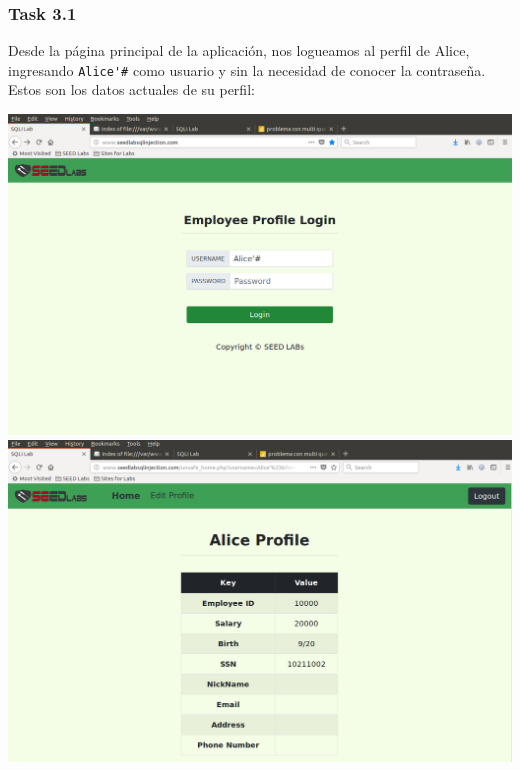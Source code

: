 \documentclass[11pt]{article}
\begin{document}
\subsubsection*{Task 3.1}
Desde la página principal de la aplicación, nos logueamos al perfil de Alice, ingresando \verb|Alice'#| como usuario 
y sin la necesidad de conocer la contraseña. Estos son los datos actuales de su perfil:
\begin{center}
    \includegraphics[scale=.35]{task3_1_1_sql.png}
    \includegraphics[scale=.35]{task3_1_2_sql.png}
\end{center}
\end{document}
